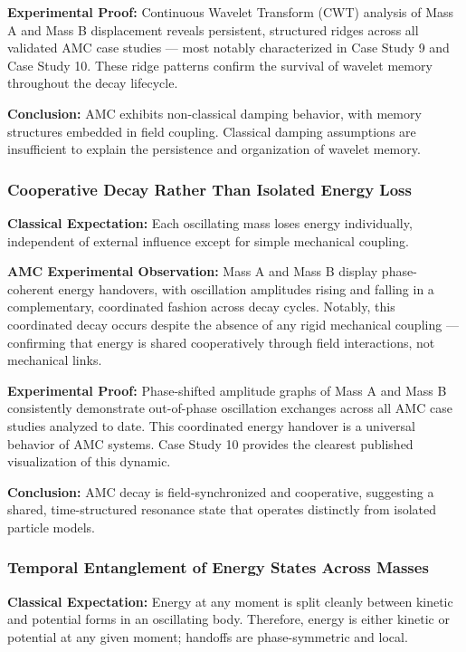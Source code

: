 \documentclass[10pt,aps,pre,onecolumn,superscriptaddress,notitlepage]{revtex4-2}
\begin{document}
\textbf{Experimental Proof:} Continuous Wavelet Transform (CWT) analysis of Mass A and Mass B displacement reveals persistent, structured ridges across all validated AMC case studies — most notably characterized in Case Study 9 and Case Study 10. These ridge patterns confirm the survival of wavelet memory throughout the decay lifecycle.

\textbf{Conclusion:} AMC exhibits non-classical damping behavior, with memory structures embedded in field coupling. Classical damping assumptions are insufficient to explain the persistence and organization of wavelet memory.

\subsubsection{Cooperative Decay Rather Than Isolated Energy Loss}
\label{sec:dev2CooperativeDecayRather}
\textbf{Classical Expectation:} Each oscillating mass loses energy individually, independent of external influence except for simple mechanical coupling.

\textbf{AMC Experimental Observation:} Mass A and Mass B display phase-coherent energy handovers, with oscillation amplitudes rising and falling in a complementary, coordinated fashion across decay cycles. Notably, this coordinated decay occurs despite the absence of any rigid mechanical coupling — confirming that energy is shared cooperatively through field interactions, not mechanical links.

\textbf{Experimental Proof:} Phase-shifted amplitude graphs of Mass A and Mass B consistently demonstrate out-of-phase oscillation exchanges across all AMC case studies analyzed to date. This coordinated energy handover is a universal behavior of AMC systems. Case Study 10 provides the clearest published visualization of this dynamic.

\textbf{Conclusion:} AMC decay is field-synchronized and cooperative, suggesting a shared, time-structured resonance state that operates distinctly from isolated particle models.

\subsubsection{Temporal Entanglement of Energy States Across Masses}
\label{sec:dev3TemporalEntanglement}
\textbf{Classical Expectation:} Energy at any moment is split cleanly between kinetic and potential forms in an oscillating body. Therefore, energy is either kinetic or potential at any given moment; handoffs are phase-symmetric and local.
\end{document}
